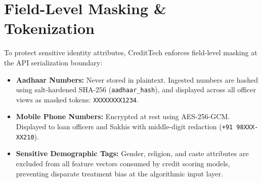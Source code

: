 \section{Field-Level Masking \& Tokenization}
To protect sensitive identity attributes, CreditTech enforces field-level masking at the API serialization boundary:
\begin{itemize}
  \item \textbf{Aadhaar Numbers:} Never stored in plaintext. Ingested numbers are hashed using salt-hardened SHA-256 (\texttt{aadhaar\_hash}), and displayed across all officer views as masked tokens: \texttt{XXXXXXXX1234}.
  \item \textbf{Mobile Phone Numbers:} Encrypted at rest using AES-256-GCM. Displayed to loan officers and Sakhis with middle-digit redaction (\texttt{+91 98XXX-XX210}).
  \item \textbf{Sensitive Demographic Tags:} Gender, religion, and caste attributes are excluded from all feature vectors consumed by credit scoring models, preventing disparate treatment bias at the algorithmic input layer.
\end{itemize}
